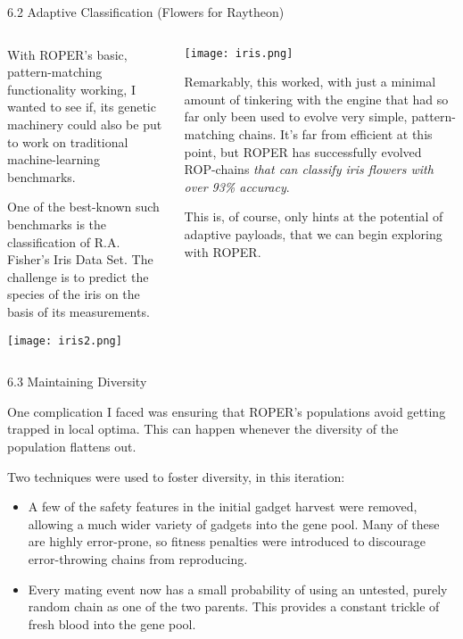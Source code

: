 \documentclass[9pt]{beamer}
\begin{document}
\begin{frame}{6.2 Adaptive Classification (Flowers for Raytheon)}

\begin{columns}
\begin{column}{.5\textwidth}
    \small
    With ROPER's basic, pattern-matching functionality working, I wanted to see if, its genetic machinery could also be put to work on traditional machine-learning benchmarks. 
    
    \vspace{.25cm}
    
    One of the best-known such benchmarks is the classification of R.A. Fisher's Iris Data Set. The challenge is to predict the species of the iris on the basis of its measurements.
    
    \vspace{.25cm}
    
    \texttt{[image: iris2.png]}
\end{column}
\begin{column}{.5\textwidth}
    \texttt{[image: iris.png]}
    
    \small
    Remarkably, this worked, with just a minimal amount of tinkering with the engine that had so far only been used to evolve very simple, pattern-matching chains. It's far from efficient at this point, but ROPER has successfully evolved ROP-chains \emph{that can classify iris flowers with over 93\% accuracy}.
    
    \vspace{.25cm}
    
    This is, of course, only hints at the potential of adaptive payloads, that we can begin exploring with ROPER.
    
\end{column}
\end{columns}
\end{frame}

\begin{frame}{6.3 Maintaining Diversity}

One complication I faced was ensuring that ROPER's populations avoid getting trapped in local optima. This can happen whenever the diversity of the population flattens out.

\vspace{.5cm}

Two techniques were used to foster diversity, in this iteration:
\begin{itemize}
    \item A few of the safety features in the initial gadget harvest were removed, allowing a much wider variety of gadgets into the gene pool. Many of these are highly error-prone, so fitness penalties were introduced to discourage error-throwing chains from reproducing.
    \item Every mating event now has a small probability of using an untested, purely random chain as one of the two parents. This provides a constant trickle of fresh blood into the gene pool.
\end{itemize}

\end{frame}
\end{document}
